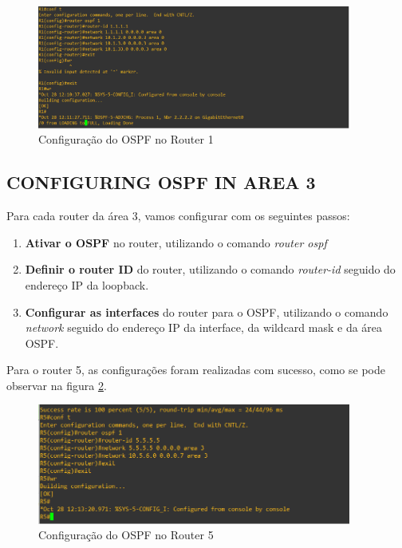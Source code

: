 \documentclass[11pt,english, openright, oneside]{book}
\begin{document}
\begin{figure}[H]
    \centering
    \includegraphics[width=0.92\textwidth]{imagens/Tarefa2/5.conf_ospf_area0.png}
    \caption{Configuração do OSPF no Router 1}
    \label{fig:config5}
\end{figure}
\vspace{0.2cm}

\subsection{CONFIGURING OSPF IN AREA 3}
\vspace{0.2cm}

Para cada router da área 3, vamos configurar com os seguintes passos:
\vspace{0.2cm}

\begin{enumerate}
  \item \textbf{Ativar o OSPF} no router, utilizando o comando \textit{router ospf}
  \item \textbf{Definir o router ID} do router, utilizando o comando \textit{router-id} seguido do endereço IP da loopback.
  \item \textbf{Configurar as interfaces} do router para o OSPF, utilizando o comando \textit{network} seguido do endereço IP da interface, da wildcard mask e da área OSPF.
\end{enumerate}
\vspace{0.2cm}

Para o router 5, as configurações foram realizadas com sucesso, como se pode observar na figura \ref{fig:config6}.
\vspace{0.2cm}

\begin{figure}[H]
    \centering
    \includegraphics[width=0.92\textwidth]{imagens/Tarefa2/5.conf_ospf_area3.png}
    \caption{Configuração do OSPF no Router 5}
    \label{fig:config6}
\end{figure}
\vspace{0.2cm}
\end{document}
